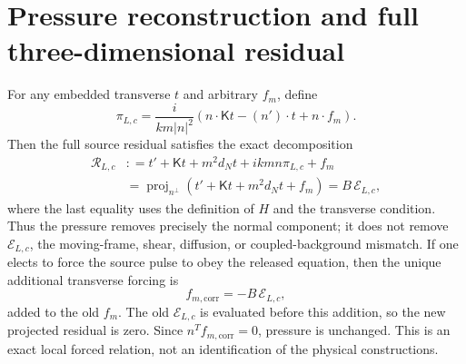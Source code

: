 \documentclass[11pt]{article}
\newcommand{\proj}{\operatorname{proj}}
\begin{document}
\section{Pressure reconstruction and full three-dimensional residual}
For any embedded transverse $t$ and arbitrary $f_m$, define
\begin{equation}
 \pi_{L,c}=\frac{i}{km|n|^2}
 \left(n\cdot\mathsf Kt-(n')\cdot t+n\cdot f_m\right).
 \label{eq:pressuremap}
\end{equation}
Then the full source residual satisfies the exact decomposition
\begin{align}
 \mathcal R_{L,c}
 &: =t'+\mathsf Kt+m^2d_Nt+ikm n\pi_{L,c}+f_m \\
 &=\proj_{n^\perp}\left(t'+\mathsf Kt+m^2d_Nt+f_m\right)
 =B\,\mathcal E_{L,c},
 \label{eq:fullresidual}
\end{align}
where the last equality uses the definition of $H$ and the transverse condition.
Thus the pressure removes precisely the normal component; it does not remove
$\mathcal E_{L,c}$, the moving-frame, shear, diffusion, or coupled-background
mismatch.  If one elects to force the source pulse to obey the released equation,
then the unique additional transverse forcing is
\begin{equation}
 f_{m,\mathrm{corr}}=-B\,\mathcal E_{L,c},
\end{equation}
added to the old $f_m$. The old $\mathcal E_{L,c}$ is evaluated before
this addition, so the new projected residual is zero.
Since $n^Tf_{m,\mathrm{corr}}=0$, pressure is unchanged.
This is an exact local
forced relation, not an identification of the physical constructions.
\end{document}
